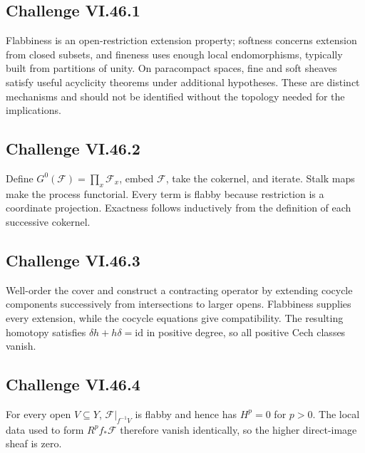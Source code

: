 \subsection*{Challenge VI.46.1}
\begin{solution}
Flabbiness is an open-restriction extension property; softness concerns extension from closed subsets, and fineness uses enough local endomorphisms, typically built from partitions of unity.  On paracompact spaces, fine and soft sheaves satisfy useful acyclicity theorems under additional hypotheses.  These are distinct mechanisms and should not be identified without the topology needed for the implications.
\end{solution}

\subsection*{Challenge VI.46.2}
\begin{solution}
Define \(G^0(\mathcal F)=\prod_x\mathcal F_x\), embed \(\mathcal F\), take the cokernel, and iterate.  Stalk maps make the process functorial.  Every term is flabby because restriction is a coordinate projection.  Exactness follows inductively from the definition of each successive cokernel.
\end{solution}

\subsection*{Challenge VI.46.3}
\begin{solution}
Well-order the cover and construct a contracting operator by extending cocycle components successively from intersections to larger opens.  Flabbiness supplies every extension, while the cocycle equations give compatibility.  The resulting homotopy satisfies \(\delta h+h\delta=\mathrm{id}\) in positive degree, so all positive Cech classes vanish.
\end{solution}

\subsection*{Challenge VI.46.4}
\begin{solution}
For every open \(V\subseteq Y\), \(\mathcal F|_{f^{-1}V}\) is flabby and hence has \(H^p=0\) for \(p>0\).  The local data used to form \(R^pf_*\mathcal F\) therefore vanish identically, so the higher direct-image sheaf is zero.
\end{solution}

